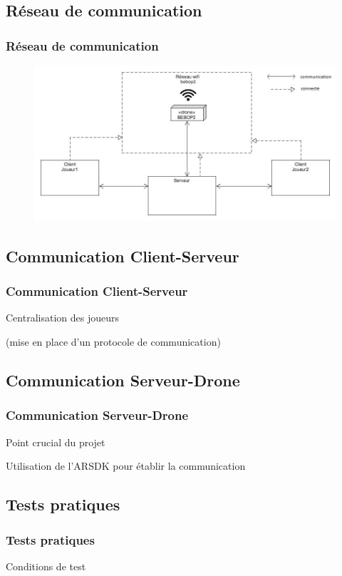 \subsection{Réseau de communication}
\begin{frame}
\frametitle{Réseau de communication}
\begin{center}
\begin{figure}
\includegraphics[scale=0.4]{images/architecture.jpg}
\end{figure}
\end{center}
\end{frame}

\subsection{Communication Client-Serveur}
\begin{frame}
\frametitle{Communication Client-Serveur}
\begin{center}
Centralisation des joueurs

(mise en place d'un protocole de communication)
\end{center}
\end{frame}

\subsection{Communication Serveur-Drone}
\begin{frame}
\frametitle{Communication Serveur-Drone}
\begin{center}
Point crucial du projet

Utilisation de l'ARSDK pour établir la communication
\end{center}
\end{frame}

\subsection{Tests pratiques}
\begin{frame}
\frametitle{Tests pratiques}
\begin{center}
Conditions de test
\end{center}
\end{frame}